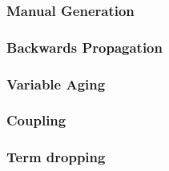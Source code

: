 \subsubsection{Manual Generation}

\cite{broda-loop-tech}

\subsubsection{Backwards Propagation}

\cite{infer-postconditions}
\cite{infer-dynamic}

\subsubsection{Variable Aging}

\cite{infer-postconditions}
\cite{infer-dynamic}

\subsubsection{Coupling}

\cite{infer-postconditions}
\cite{infer-dynamic}

\subsubsection{Term dropping}

\cite{infer-postconditions}
\cite{infer-dynamic}

\cite{struct-induction}
